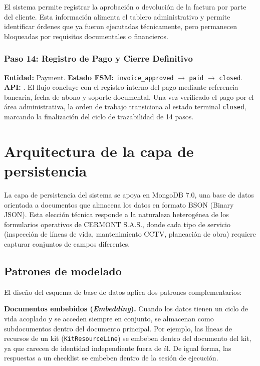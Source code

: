 El sistema permite registrar la aprobación o devolución de la factura por parte del cliente. Esta información alimenta el tablero administrativo y permite identificar órdenes que ya fueron ejecutadas técnicamente, pero permanecen bloqueadas por requisitos documentales o financieros.

\subsubsection{Paso 14: Registro de Pago y Cierre Definitivo}
\textbf{Entidad:} Payment. \textbf{Estado FSM:} \texttt{invoice\_approved} $\rightarrow$ \texttt{paid} $\rightarrow$ \texttt{closed}. \textbf{API:} .
El flujo concluye con el registro interno del pago mediante referencia bancaria, fecha de abono y soporte documental. Una vez verificado el pago por el área administrativa, la orden de trabajo transiciona al estado terminal \texttt{closed}, marcando la finalización del ciclo de trazabilidad de 14 pasos.

\section{Arquitectura de la capa de persistencia}
\label{sec:persistencia}

La capa de persistencia del sistema se apoya en MongoDB 7.0, una base de datos orientada a documentos que almacena los datos en formato BSON (Binary JSON). Esta elección técnica responde a la naturaleza heterogénea de los formularios operativos de CERMONT S.A.S., donde cada tipo de servicio (inspección de líneas de vida, mantenimiento CCTV, planeación de obra) requiere capturar conjuntos de campos diferentes.

\subsection{Patrones de modelado}

El diseño del esquema de base de datos aplica dos patrones complementarios:

\textbf{Documentos embebidos (\textit{Embedding}).} Cuando los datos tienen un ciclo de vida acoplado y se acceden siempre en conjunto, se almacenan como subdocumentos dentro del documento principal. Por ejemplo, las líneas de recursos de un kit (\texttt{KitResourceLine}) se embeben dentro del documento del kit, ya que carecen de identidad independiente fuera de él. De igual forma, las respuestas a un checklist se embeben dentro de la sesión de ejecución.

